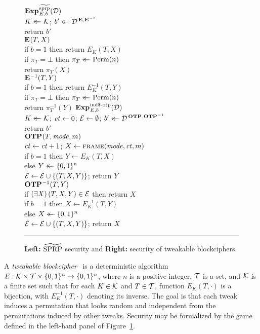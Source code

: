 \newcommand{\otpsec}{\notionfont{IND\$\mbox{-}OTP}}
\newcommand{\OTPO}{\oraclefont{OTP}}
\newcommand{\mode}{\varfont{mode}}
\newcommand{\OTP}{\schemefont{otp}}
\newcommand{\INIT}{\schemefont{init}}
\newcommand{\calM}{\setfont{M}}
\begin{figure}
  \newcommand{\fmtframe}{\schemefont{frame}}
  {
    \underline{$\Exp{\tsprp}_{E,b}(\advD)$}\\[2pt]
      $K \mathrel{\leftarrow\mkern-14mu\leftarrow} \mathcal{K}$;
      $b' \mathrel{\leftarrow\mkern-14mu\leftarrow} \mathcal{D}^{\,\textbf{E}\hspace{0.5pt},\textbf{E}\hspace{0.5pt}^{-1}}$\\
      return $b'$
    \\[6pt]
    \underline{$\textbf{E}\hspace{0.5pt}(T, X)$}\\[2pt]
      if $b=1$ then return $E_K(T, X)$\\
      if $\pi_T = \bot$ then $\pi_T \mathrel{\leftarrow\mkern-14mu\leftarrow} \mathrm{Perm}(n)$\\
      return $\pi_T(X)$
    \\[14pt]
    \underline{$\textbf{E}\hspace{0.5pt}^{-1}(T, Y)$}\\[2pt]
      if $b=1$ then return $E^{-1}_K(T, Y)$\\
      if $\pi_T = \bot$ then $\pi_T \mathrel{\leftarrow\mkern-14mu\leftarrow} \mathrm{Perm}(n)$\\
      return $\pi^{-1}_T(Y)$
  }
  {
    \underline{$\Exp{\otpsec}_{E,b}(\advD)$}\\[2pt]
       $K \mathrel{\leftarrow\mkern-14mu\leftarrow} \mathcal{K}$; $\mathit{ct} \gets 0$; $\mathcal{E} \gets \emptyset$;
       $b' \getsr \advD^{\,\OTPO,\OTPO^{-1}}$\\
       return $b'$
    \\[6pt]
    \underline{$\OTPO(T, \mode, m)$}\\[2pt]
      $\mathit{ct} \gets \mathit{ct} + 1$;
      $X \gets \fmtframe(\mode, \ct, m)$
        \\
      if $b=1$ then $Y \gets E_K(T, X)$\\
      else $Y \mathrel{\leftarrow\mkern-14mu\leftarrow} \{0,1\}^n$\\
      $\mathcal{E} \gets \mathcal{E} \cup \{(T, X, Y)\}$; return $Y$
    \\[6pt]
    \underline{$\OTPO^{-1}(T,Y)$}\\[2pt]
      if $(\exists X)\,(T, X, Y) \in \mathcal{E}$ then return $X$\\
      if $b=1$ then $X \gets E^{-1}_K(T, Y)$\\
      else $X \mathrel{\leftarrow\mkern-14mu\leftarrow} \{0,1\}^n$\\
      $\mathcal{E} \gets \mathcal{E} \cup \{(T, X, Y)\}$; return $X$
  }
  \caption{\textbf{Left:} $\widetilde{\textnormal{SPRP}}$ security and \textbf{Right:} \otpsec security of
  tweakable blockciphers.}
  \label{fig2}
  \vspace{6pt}
  \hrule
\end{figure}
A \emph{tweakable blockcipher}~\cite{liskov2011tweakable} is a deterministic algorithm
$E:\mathcal{K}\times\mathcal{T}\times\{0,1\}^n\to\{0,1\}^n$, where $n$ is a positive integer, $\mathcal{T}$ is a set,
and $\mathcal{K}$ is a finite set such that for each $K\in\mathcal{K}$ and $T\in\mathcal{T}$,
function $E_K(T,\cdot)$ is a bijection, with $E_K^{-1}(T,\cdot)$ denoting its
inverse.
%
The goal is that each tweak induces a permutation that looks random and
independent from the permutations induced by other tweaks. Security may be
formalized by the game defined in the left-hand panel of Figure~\ref{fig2}.

